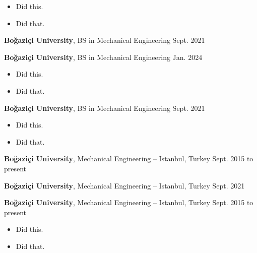 \documentclass[10pt, letterpaper]{article}
\newenvironment{highlights}{
        \begin{itemize}[
                topsep=0pt,
                partopsep=0pt,
                itemsep=0pt,
                leftmargin=10pt
            ]
    }{
        \end{itemize}
    } %
\begin{document}
        \begin{highlights}
        \item Did this.
        \item Did that.
        \end{highlights}


        \vspace{8pt}

        \textbf{Boğaziçi University}, BS in Mechanical Engineering \hfill Sept. 2021



        \vspace{8pt}

        \textbf{Boğaziçi University}, BS in Mechanical Engineering \hfill Jan. 2024

        \begin{highlights}
        \item Did this.
        \item Did that.
        \end{highlights}


        \vspace{8pt}

        \textbf{Boğaziçi University}, BS in Mechanical Engineering \hfill Sept. 2021

        \begin{highlights}
        \item Did this.
        \item Did that.
        \end{highlights}


        \vspace{8pt}

        \textbf{Boğaziçi University}, Mechanical Engineering -- Istanbul, Turkey \hfill Sept. 2015 to present



        \vspace{8pt}

        \textbf{Boğaziçi University}, Mechanical Engineering -- Istanbul, Turkey \hfill Sept. 2021



        \vspace{8pt}

        \textbf{Boğaziçi University}, Mechanical Engineering -- Istanbul, Turkey \hfill Sept. 2015 to present

        \begin{highlights}
        \item Did this.
        \item Did that.
        \end{highlights}
\end{document}
